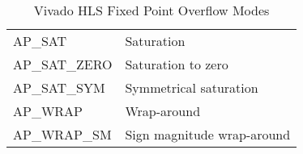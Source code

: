 \begin{table}[!h]
\centering
\begin{tabular}{m{4cm} m{6cm}}
AP\_SAT & Saturation\\
AP\_SAT\_ZERO& Saturation to zero\\
AP\_SAT\_SYM & Symmetrical saturation\\
AP\_WRAP & Wrap-around\\
AP\_WRAP\_SM&Sign magnitude wrap-around\\
\end{tabular}
\caption{Vivado HLS Fixed Point Overflow Modes}
\label{overflow}
\end{table}